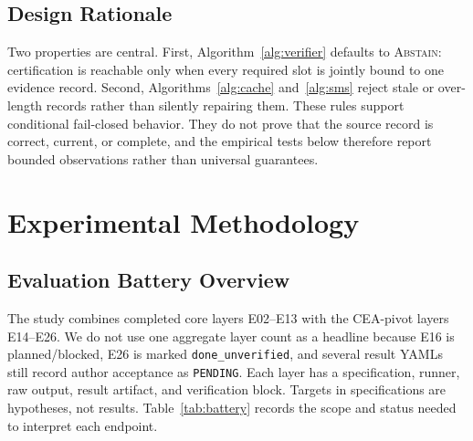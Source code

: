 \documentclass[11pt,a4paper]{article}
\begin{document}
\subsection{Design Rationale}
Two properties are central. First, Algorithm~\ref{alg:verifier} defaults to \textsc{Abstain}: certification is reachable only when every required slot is jointly bound to one evidence record. Second, Algorithms~\ref{alg:cache} and~\ref{alg:sms} reject stale or over-length records rather than silently repairing them. These rules support conditional fail-closed behavior. They do not prove that the source record is correct, current, or complete, and the empirical tests below therefore report bounded observations rather than universal guarantees.


\section{Experimental Methodology}
\label{sec:experiments}

\subsection{Evaluation Battery Overview}
The study combines completed core layers E02--E13 with the CEA-pivot layers E14--E26. We do not use one aggregate layer count as a headline because E16 is planned/blocked, E26 is marked \texttt{done\_unverified}, and several result YAMLs still record author acceptance as \texttt{PENDING}. Each layer has a specification, runner, raw output, result artifact, and verification block. Targets in specifications are hypotheses, not results. Table~\ref{tab:battery} records the scope and status needed to interpret each endpoint.
\end{document}
